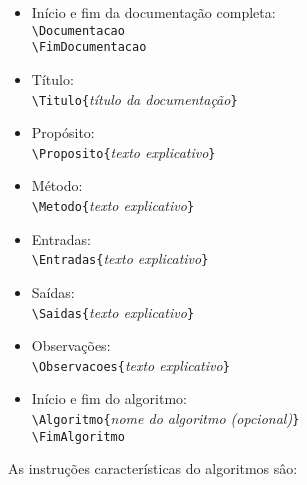 \documentclass[a4paper,12pt,oneside,onecolumn]{article}
\newcommand{\comando}[1]{\texttt{\textbackslash #1}}
\newcommand{\param}[1]{\texttt{\{}\textsl{#1}\texttt{\}}}
\begin{document}
\begin{itemize}
  \item Início e fim da documentação completa:\\
    \comando{Documentacao}\\
    \comando{FimDocumentacao}
  \item Título:\\
    \comando{Titulo}\param{título da documentação}
  \item Propósito:\\
    \comando{Proposito}\param{texto explicativo}
  \item Método:\\
    \comando{Metodo}\param{texto explicativo}
  \item Entradas:\\
    \comando{Entradas}\param{texto explicativo}
  \item Saídas:\\
    \comando{Saidas}\param{texto explicativo}
  \item Observações:\\
    \comando{Observacoes}\param{texto explicativo}
  \item Início e fim do algoritmo:\\
    \comando{Algoritmo}\param{nome do algoritmo (opcional)}\\
    \comando{FimAlgoritmo}
\end{itemize}

As instruções características do algoritmos sâo:
\end{document}
